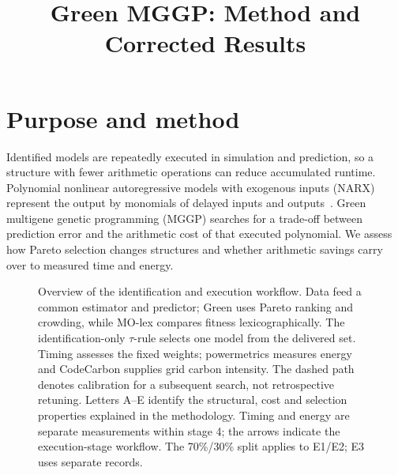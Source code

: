 \documentclass[11pt,a4paper]{article}
\theoremstyle{definition}
\theoremstyle{plain}
\theoremstyle{remark}
\begin{document}
\title{Green MGGP: Method and Corrected Results}
\author{}\date{}\maketitle



\section{Purpose and method}
Identified models are repeatedly executed in simulation and prediction, so a structure with fewer arithmetic operations can reduce accumulated runtime. Polynomial nonlinear autoregressive models with exogenous inputs (NARX) represent the output by monomials of delayed inputs and outputs~\cite{Bil2013}. Green multigene genetic programming (MGGP) searches for a trade-off between prediction error and the arithmetic cost of that executed polynomial. We assess how Pareto selection changes structures and whether arithmetic savings carry over to measured time and energy.

\begin{figure}[!htbp]\centering
\resizebox{\textwidth}{!}{}
\caption{Overview of the identification and execution workflow. Data feed a common estimator and predictor; Green uses Pareto ranking and crowding, while MO-lex compares fitness lexicographically. The identification-only $\tau$-rule selects one model from the delivered set. Timing assesses the fixed weights; powermetrics measures energy and CodeCarbon supplies grid carbon intensity. The dashed path denotes calibration for a subsequent search, not retrospective retuning. Letters A--E identify the structural, cost and selection properties explained in the methodology. Timing and energy are separate measurements within stage 4; the arrows indicate the execution-stage workflow. The 70\%/30\% split applies to E1/E2; E3 uses separate records.}
\label{fig:pipeline}
\end{figure}
\end{document}
